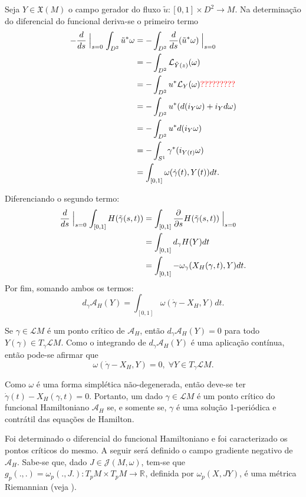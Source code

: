 \documentclass[12pt]{book}
\newcommand{\campohamiltonianoabrev}{X_{H}}
\newcommand{\campossuaves}[1]{\mathfrak{X}(#1)}
\newcommand{\circulo}{S^{1}}
\newcommand{\derivadaparcial}[2]{\frac{\partial #1}{\partial #2}}
\newcommand{\espacotangenteponto}[2]{T_{#1}#2}
\newcommand{\estruturascomplexas}[2]{\mathcal{J}(#1, #2)}
\newcommand{\funcionalH}{\mathcal{A}_{H}}
\newcommand{\intervalo}{[0,1]}
\newcommand{\real}[1]{\mathbb{R}^{#1}}
\newcommand{\reta}{\real{}}
\newcommand{\lacocontrateis}{\mathcal{L}M}
\newcommand{\vermelho}[1]{{\color{red}#1}}
\begin{document}
	Seja $Y\in \campossuaves{M}$ o campo gerador do fluxo $\tilde{u}:\intervalo\times D^{2}\to M$. Na determinação do diferencial do funcional deriva-se o primeiro termo
	$$
	\begin{aligned}
	-\frac{d}{ds} \Bigm\lvert_{s=0} \int_{D^{2}}\tilde{u}^{*}\omega 
	&=-\int_{D^{2}}\frac{d}{ds} (\tilde{u}^{*}\omega)\Bigm\lvert_{s=0} \\
	&=-\int_{D^{2}} \mathcal{L}_{\tilde{Y}(z)}(\omega)
	\\
	&=-\int_{D^{2}}u^{*} \mathcal{L}_{Y}(\omega)\vermelho{?????????}
	\\
	&=-\int_{D^{2}}u^{*} (d(i_{Y}\omega) + i_{Y}d\omega)
	\\
	&=-\int_{D^{2}}u^{*} d(i_{Y}\omega)
	\\
	&=-\int_{\circulo}	\gamma^{*} (i_{Y(t)}\omega)
	\\
	&= \int_{[0,1]} \omega(\dot{\gamma}(t), Y(t))dt.
	\end{aligned}
	$$
	
	Diferenciando o segundo termo:
	$$
	\begin{aligned}
	\frac{d}{ds} \Bigm\lvert_{s=0} \int_{[0,1]} H(\tilde{\gamma}(s,t)) 
	&= \int_{[0,1]} \derivadaparcial{}{s} H(\tilde{\gamma}(s,t)) \Bigm\lvert_{s=0}
	\\
	&= \int_{[0,1]} d_{\gamma}H(Y)dt
	\\
	&= \int_{[0,1]} -\omega_{\gamma}(\campohamiltonianoabrev(\gamma, t), Y)dt. 
	\end{aligned}
	$$
	Por fim, somando ambos os termos:
	$$
	d_{\gamma}\funcionalH(Y) = \int_{[0,1]} \omega(\dot{\gamma} - \campohamiltonianoabrev, Y)dt.
	$$
	
	Se $\gamma \in \lacocontrateis$ é um ponto crítico de $\funcionalH$, então $d_{\gamma}\funcionalH(Y) = 0 $ para todo $Y(\gamma) \in \espacotangenteponto{\gamma}{\lacocontrateis}$. Como o integrando de $d_{\gamma}\funcionalH(Y)$ é uma aplicação contínua, então pode-se afirmar que
	$$
	\omega(\dot{\gamma} - \campohamiltonianoabrev, Y)=0,\; \forall Y \in \espacotangenteponto{\gamma}{\lacocontrateis}.
	$$
	
	Como $\omega$  é uma forma simplética não-degenerada, então deve-se ter $\dot{\gamma}(t) - \campohamiltonianoabrev(\gamma, t)=0$. Portanto, um dado $\gamma \in \lacocontrateis$ é um ponto crítico do funcional Hamiltoniano $\funcionalH$ se, e somente se, $\gamma$ é uma solução 1-periódica e contrátil das equações de Hamilton.
	
	Foi determinado o diferencial do funcional Hamiltoniano e foi caracterizado os pontos críticos do mesmo. A seguir será definido o campo gradiente negativo de $\funcionalH$. Sabe-se que, dado $J \in \estruturascomplexas{M}{\omega}$, tem-se que $g_{p}(., .)=\omega_{p}(.,J.):T_{p}M\times T_{p}M \to \reta$, definida por $\omega_{p}(X,JY)$, é uma métrica Riemannian (veja \cite{manfredo_riemannian_geo}).
	
\end{document}
